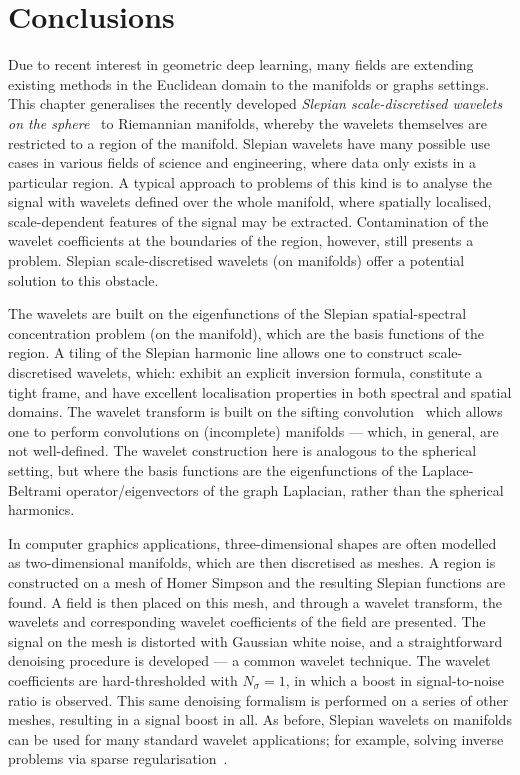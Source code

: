





\section{Conclusions}\label{sec:chapter5_conclusions}

Due to recent interest in geometric deep learning, many fields are extending existing methods in the Euclidean domain to the manifolds or graphs settings.
This chapter generalises the recently developed \emph{Slepian scale-discretised wavelets on the sphere}~\cite{Roddy2021a} to Riemannian manifolds, whereby the wavelets themselves are restricted to a region of the manifold.
Slepian wavelets have many possible use cases in various fields of science and engineering, where data only exists in a particular region.
A typical approach to problems of this kind is to analyse the signal with wavelets defined over the whole manifold, where spatially localised, scale-dependent features of the signal may be extracted.
Contamination of the wavelet coefficients at the boundaries of the region, however, still presents a problem.
Slepian scale-discretised wavelets (on manifolds) offer a potential solution to this obstacle.

The wavelets are built on the eigenfunctions of the Slepian spatial-spectral concentration problem (on the manifold), which are the basis functions of the region.
A tiling of the Slepian harmonic line allows one to construct scale-discretised wavelets, which: exhibit an explicit inversion formula, constitute a tight frame, and have excellent localisation properties in both spectral and spatial domains.
The wavelet transform is built on the sifting convolution~\cite{Roddy2021} which allows one to perform convolutions on (incomplete) manifolds --- which, in general, are not well-defined.
The wavelet construction here is analogous to the spherical setting, but where the basis functions are the eigenfunctions of the Laplace-Beltrami operator/eigenvectors of the graph Laplacian, rather than the spherical harmonics.

In computer graphics applications, three-dimensional shapes are often modelled as two-dimensional manifolds, which are then discretised as meshes.
A region is constructed on a mesh of Homer Simpson and the resulting Slepian functions are found.
A field is then placed on this mesh, and through a wavelet transform, the wavelets and corresponding wavelet coefficients of the field are presented.
The signal on the mesh is distorted with Gaussian white noise, and a straightforward denoising procedure is developed --- a common wavelet technique.
The wavelet coefficients are hard-thresholded with \(N_{\sigma}=1\), in which a boost in signal-to-noise ratio is observed.
This same denoising formalism is performed on a series of other meshes, resulting in a signal boost in all.
As before, Slepian wavelets on manifolds can be used for many standard wavelet applications; for example, solving inverse problems via sparse regularisation~\cite{McEwen2013a,Wallis2017,Price2021}.
